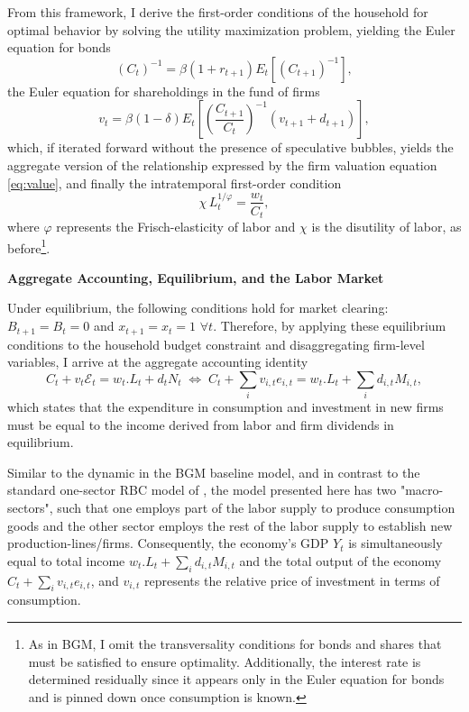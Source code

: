 \documentclass[a4paper,12pt]{article} %
\numberwithin{equation}{section} %
\numberwithin{figure}{section}
\numberwithin{table}{section}
\begin{document}
From this framework, I derive the first-order conditions of the household for optimal behavior by solving the utility maximization problem,
yielding the Euler equation for bonds 
\begin{equation}
(C_t)^{-1} = \beta (1 + r_{t+1}) E_t \left[ (C_{t+1})^{-1} \right], \label{eq:eulerbonds}
\end{equation}
the Euler equation for shareholdings in the fund of firms 
\begin{equation}
v_t = \beta (1 - \delta) E_t \left[ \left( \frac{C_{t+1}}{C_t} \right)^{-1} (v_{t+1} + d_{t+1}) \right], \label{eq:Eulershares}
\end{equation}
which, if iterated forward without the presence of speculative bubbles, yields the aggregate version of the 
relationship expressed by the firm valuation equation \eqref{eq:value}, and finally the intratemporal 
first-order condition 
\begin{equation}
\chi\,L_{t}^{1/\varphi}=\frac{w_t}{C_t}, \label{eq:intratemp}
\end{equation}
where $\varphi$ represents the Frisch-elasticity of labor and $\chi$ is the
disutility of labor, as before\footnote{As in BGM, I omit the transversality conditions for bonds and shares that must be satisfied to
ensure optimality. Additionally, the interest rate is determined residually since it appears only in the Euler equation for bonds and is pinned
down once consumption is known.}.

\medskip
\medskip
\noindent\textbf{Aggregate Accounting, Equilibrium, and the Labor Market}
\medskip

Under equilibrium, the following conditions hold for market clearing: $B_{t+1} = B_t=0$ and $x_{t+1}=x_t=1$ $\forall t$. Therefore, by applying these
equilibrium conditions to the household budget constraint and disaggregating firm-level variables, I arrive at the aggregate accounting identity
\begin{equation}
C_t + v_t\mathcal{E}_t= w_t.L_t + d_tN_t \;\Leftrightarrow\;C_t + \sum_iv_{i,t}e_{i,t}= w_t.L_t + \sum_id_{i,t}M_{i,t}, \label{eq:aggaccount}
\end{equation}
which states that the expenditure in consumption and investment in new firms must be equal to the income derived from labor and 
firm dividends in equilibrium.

Similar to the dynamic in the BGM baseline model, and in contrast to the standard one-sector RBC model of \textcite{campbell1994inspecting}, 
the model presented here has two "macro-sectors", such that one employs part of the labor supply to produce consumption goods and the other
sector employs the rest of the labor supply to establish new production-lines/firms. Consequently, the economy's GDP $Y_t$ is simultaneously
equal to total income $w_t.L_t + \sum_id_{i,t}M_{i,t}$ and the total output of the economy $C_t + \sum_iv_{i,t}e_{i,t}$, and $v_{i,t}$ represents 
the relative price of investment in terms of consumption.
\end{document}
